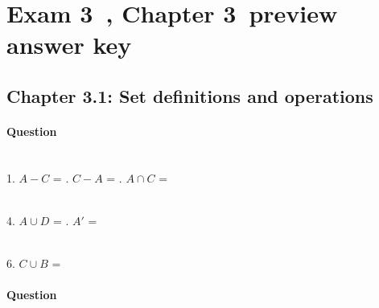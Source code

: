 \documentclass[a4paper,12pt]{book} \usepackage[utf8]{inputenc} \title{} \author{Rachel Morris} \date{\today}
\newcommand{\laChapter}{Chapter 3\ } \newcommand{\laExam}{Exam 3\ }
\newcounter{answer}
\begin{document}
\hrulefill


\toggletrue{answerkey}

    \section*{\laExam, \laChapter preview answer key}

    \subsection*{Chapter 3.1: Set definitions and operations}

    \paragraph{Question \theanswer}

    ~\\
    1.   $A - C$  =  .   $C - A$ = \solution{ $ \emptyset $ }{} .   $A \cap C$ =  \tab{}

    ~\\
    4.   $A \cup D$ =  .   $A'$ =  \tab{}

    ~\\
    6.   $C \cup B$ =  \tab

    \paragraph{Question \theanswer} ~\\
\end{document}
